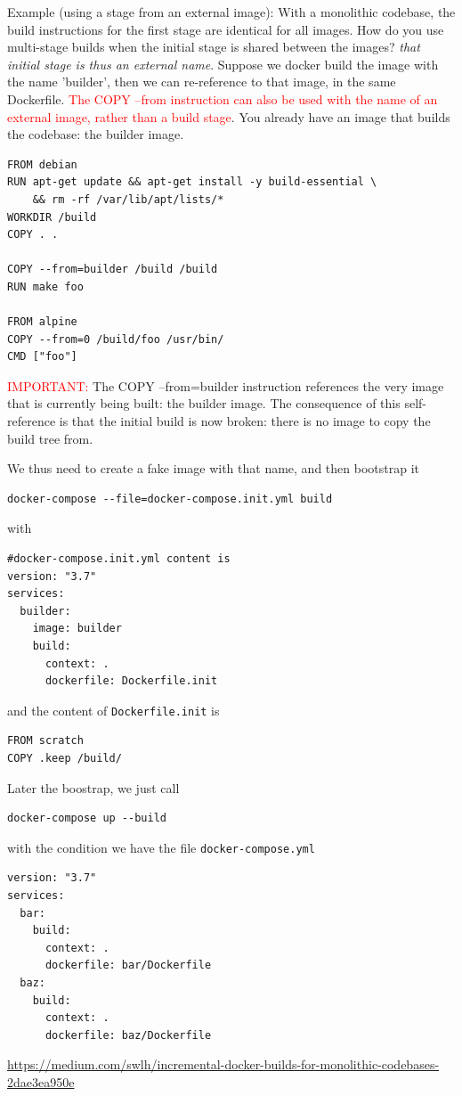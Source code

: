 Example (using a stage from an external image): With a monolithic codebase, the
build instructions for the first stage are identical for all images. How do you
use multi-stage builds when the initial stage is shared between the images? {\it
that initial stage is thus an external name}. Suppose we docker build the image
with the name 'builder', then we can re-reference to that image, in the same
Dockerfile. \textcolor{red}{The COPY --from instruction can also be used with
the name of an external image, rather than a build stage}. You already have an
image that builds the codebase:
the builder image.
\begin{verbatim}
FROM debian
RUN apt-get update && apt-get install -y build-essential \
    && rm -rf /var/lib/apt/lists/*
WORKDIR /build
COPY . .

COPY --from=builder /build /build
RUN make foo

FROM alpine
COPY --from=0 /build/foo /usr/bin/
CMD ["foo"]
\end{verbatim}

\textcolor{red}{IMPORTANT:}
The COPY --from=builder instruction references the very image that is currently
being built: the builder image. The consequence of this self-reference is that
the initial build is now broken: there is no image to copy the build tree from.

We thus need to create a fake image with that name, and then bootstrap it
\begin{verbatim}
docker-compose --file=docker-compose.init.yml build
\end{verbatim}
with 
\begin{verbatim}
#docker-compose.init.yml content is
version: "3.7"
services:
  builder:
    image: builder
    build:
      context: .
      dockerfile: Dockerfile.init
\end{verbatim}
and the content of \verb!Dockerfile.init! is
\begin{verbatim}
FROM scratch
COPY .keep /build/
\end{verbatim}

Later the boostrap, we just call
\begin{verbatim}
docker-compose up --build
\end{verbatim}
with the condition we have the file \verb!docker-compose.yml!
\begin{verbatim}
version: "3.7"
services:
  bar:
    build:
      context: .
      dockerfile: bar/Dockerfile
  baz:
    build:
      context: .
      dockerfile: baz/Dockerfile
\end{verbatim}
\url{https://medium.com/swlh/incremental-docker-builds-for-monolithic-codebases-2dae3ea950e}

